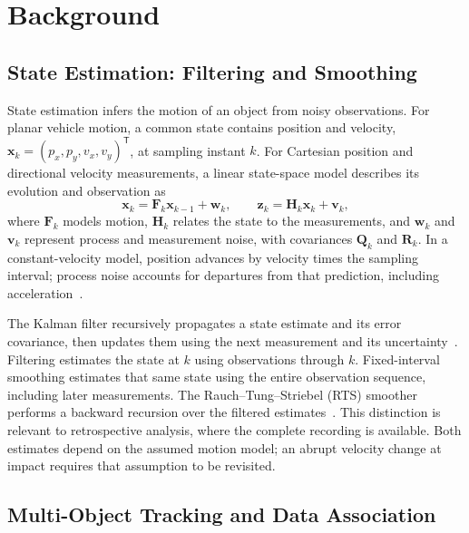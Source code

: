 \section{Background}
\label{sec:background}

\subsection{State Estimation: Filtering and Smoothing}
\label{subsec:state-estimation}

State estimation infers the motion of an object from noisy observations.
For planar vehicle motion, a common state contains position and velocity,
$\mathbf{x}_k=(p_x,p_y,v_x,v_y)^{\mathsf T}$, at sampling instant $k$.
For Cartesian position and directional velocity measurements, a linear
state-space model describes its evolution and observation as
\begin{equation}
  \mathbf{x}_k=\mathbf{F}_k\mathbf{x}_{k-1}+\mathbf{w}_k,
  \qquad
  \mathbf{z}_k=\mathbf{H}_k\mathbf{x}_k+\mathbf{v}_k,
  \label{eq:state-space}
\end{equation}
where $\mathbf{F}_k$ models motion, $\mathbf{H}_k$ relates the state to the
measurements, and $\mathbf{w}_k$ and $\mathbf{v}_k$ represent process and
measurement noise, with covariances $\mathbf{Q}_k$ and $\mathbf{R}_k$.
In a constant-velocity model, position advances by velocity times the
sampling interval; process noise accounts for departures from that
prediction, including acceleration~\cite{barshalom2001estimation}.

The Kalman filter recursively propagates a state estimate and its error
covariance, then updates them using the next measurement and its
uncertainty~\cite{kalman1960filtering}. Filtering estimates the state at
$k$ using observations through $k$. Fixed-interval smoothing estimates
that same state using the entire observation sequence, including later
measurements. The Rauch--Tung--Striebel (RTS) smoother performs a backward
recursion over the filtered estimates~\cite{rauch1965smoothing}.
This distinction is relevant to retrospective analysis, where the complete
recording is available. Both estimates depend on the assumed motion model;
an abrupt velocity change at impact requires that assumption to be revisited.

\subsection{Multi-Object Tracking and Data Association}
\label{subsec:multi-object-tracking}

